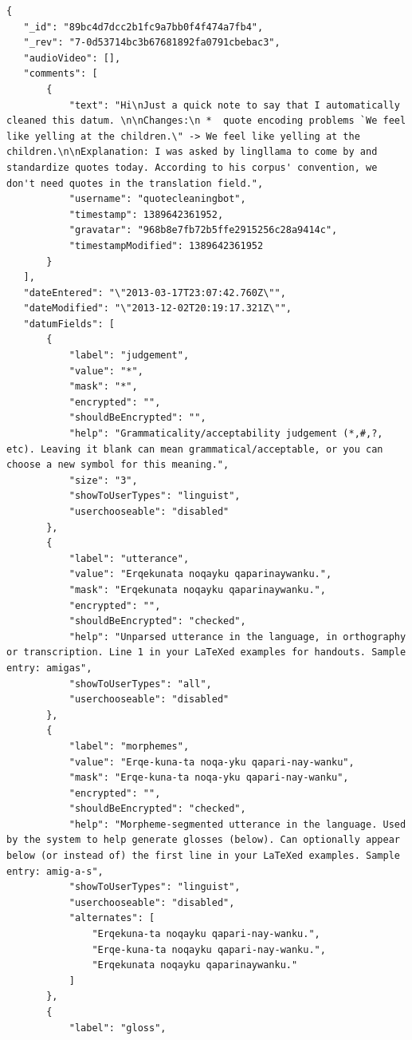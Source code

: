 \documentclass[12pt]{article}
\begin{document}
\begin{verbatim}
{
   "_id": "89bc4d7dcc2b1fc9a7bb0f4f474a7fb4",
   "_rev": "7-0d53714bc3b67681892fa0791cbebac3",
   "audioVideo": [],
   "comments": [
       {
           "text": "Hi\nJust a quick note to say that I automatically cleaned this datum. \n\nChanges:\n *  quote encoding problems `We feel like yelling at the children.\" -> We feel like yelling at the children.\n\nExplanation: I was asked by lingllama to come by and standardize quotes today. According to his corpus' convention, we don't need quotes in the translation field.",
           "username": "quotecleaningbot",
           "timestamp": 1389642361952,
           "gravatar": "968b8e7fb72b5ffe2915256c28a9414c",
           "timestampModified": 1389642361952
       }
   ],
   "dateEntered": "\"2013-03-17T23:07:42.760Z\"",
   "dateModified": "\"2013-12-02T20:19:17.321Z\"",
   "datumFields": [
       {
           "label": "judgement",
           "value": "*",
           "mask": "*",
           "encrypted": "",
           "shouldBeEncrypted": "",
           "help": "Grammaticality/acceptability judgement (*,#,?, etc). Leaving it blank can mean grammatical/acceptable, or you can choose a new symbol for this meaning.",
           "size": "3",
           "showToUserTypes": "linguist",
           "userchooseable": "disabled"
       },
       {
           "label": "utterance",
           "value": "Erqekunata noqayku qaparinaywanku.",
           "mask": "Erqekunata noqayku qaparinaywanku.",
           "encrypted": "",
           "shouldBeEncrypted": "checked",
           "help": "Unparsed utterance in the language, in orthography or transcription. Line 1 in your LaTeXed examples for handouts. Sample entry: amigas",
           "showToUserTypes": "all",
           "userchooseable": "disabled"
       },
       {
           "label": "morphemes",
           "value": "Erqe-kuna-ta noqa-yku qapari-nay-wanku",
           "mask": "Erqe-kuna-ta noqa-yku qapari-nay-wanku",
           "encrypted": "",
           "shouldBeEncrypted": "checked",
           "help": "Morpheme-segmented utterance in the language. Used by the system to help generate glosses (below). Can optionally appear below (or instead of) the first line in your LaTeXed examples. Sample entry: amig-a-s",
           "showToUserTypes": "linguist",
           "userchooseable": "disabled",
           "alternates": [
               "Erqekuna-ta noqayku qapari-nay-wanku.",
               "Erqe-kuna-ta noqayku qapari-nay-wanku.",
               "Erqekunata noqayku qaparinaywanku."
           ]
       },
       {
           "label": "gloss",

\end{verbatim}
\end{document}
